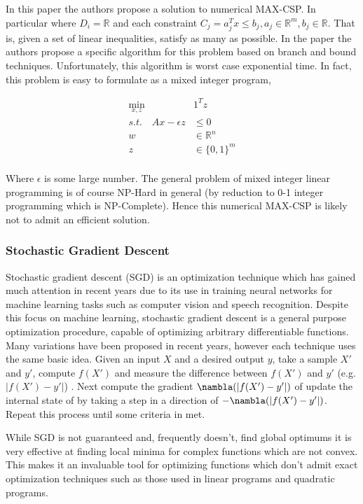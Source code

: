 \documentclass[a4paper]{article}
\begin{document}
In this paper the authors propose a solution to numerical MAX-CSP. In particular where 
$D_i = \mathds{R}$ and each constraint $C_j = a_j^Tx \leq b_j, a_j \in \mathds{R}^m, b_j \in \mathds{R}$. 
That is, given a set of linear inequalities, satisfy as many as possible. In the paper the authors 
propose a specific algorithm for this problem based on branch and bound techniques. Unfortunately, 
this algorithm is worst case exponential time. In fact, this problem is easy to formulate as a mixed integer 
program,

\begin{align*}
\min_{x,z}\quad &1^Tz\\
s.t. \quad Ax - \epsilon z &\leq 0\\
		w &\in \mathds{R}^n\\
		z &\in \{0,1\}^m\\
\end{align*}

Where $\epsilon$ is some large number. The general problem of mixed integer linear programming is 
of course NP-Hard in general (by reduction to 0-1 integer programming which is NP-Complete). Hence 
this numerical MAX-CSP is likely not to admit an efficient solution. 

\subsubsection{Stochastic Gradient Descent}

Stochastic gradient descent (SGD) is an optimization technique which has gained much 
attention in recent years due to its use in training neural networks for machine learning 
tasks such as computer vision and speech recognition. Despite this focus on machine learning,
stochastic gradient descent is a general purpose optimization procedure, capable of optimizing arbitrary 
differentiable functions. Many variations have been proposed in recent years, however
each technique uses the same basic idea. Given an input $X$ and a desired output $y$, take a sample $X'$ and $y'$, compute $f(X')$ and 
measure the difference between $f(X')$ and $y'$ (e.g. $|f(X') - y'|$) . Next compute the gradient $\nambla(|f(X') - y'|)$ 
of update the internal state of by taking a step in a direction of $-\nambla(|f(X') - y'|)$. Repeat this 
process until some criteria in met.

While SGD is not guaranteed and, frequently doesn't, find global optimums it is very effective at finding 
local minima for complex functions which are not convex. This makes it an invaluable tool for 
optimizing functions which don't admit exact optimization techniques such as those used in 
linear programs and quadratic programs.
\end{document}
